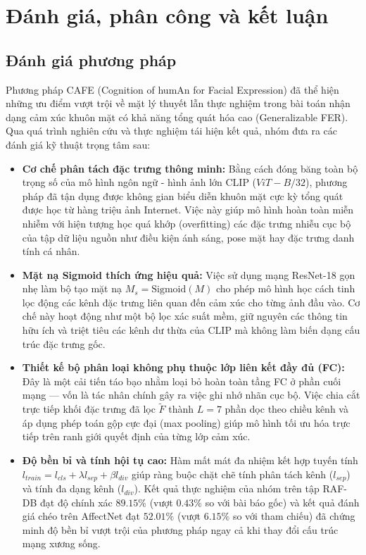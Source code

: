 \section{Đánh giá, phân công và kết luận}

\subsection{Đánh giá phương pháp}

Phương pháp CAFE (Cognition of humAn for Facial Expression) đã thể hiện những ưu điểm vượt trội về mặt lý thuyết lẫn thực nghiệm trong bài toán nhận dạng cảm xúc khuôn mặt có khả năng tổng quát hóa cao (Generalizable FER). Qua quá trình nghiên cứu và thực nghiệm tái hiện kết quả, nhóm đưa ra các đánh giá kỹ thuật trọng tâm sau:

\begin{itemize}
    \item \textbf{Cơ chế phân tách đặc trưng thông minh:} Bằng cách đóng băng toàn bộ trọng số của mô hình ngôn ngữ - hình ảnh lớn CLIP ($ViT-B/32$), phương pháp đã tận dụng được không gian biểu diễn khuôn mặt cực kỳ tổng quát được học từ hàng triệu ảnh Internet. Việc này giúp mô hình hoàn toàn miễn nhiễm với hiện tượng học quá khớp (overfitting) các đặc trưng nhiễu cục bộ của tập dữ liệu nguồn như điều kiện ánh sáng, pose mặt hay đặc trưng danh tính cá nhân.
    \item \textbf{Mặt nạ Sigmoid thích ứng hiệu quả:} Việc sử dụng mạng ResNet-18 gọn nhẹ làm bộ tạo mặt nạ $M_s = \text{Sigmoid}(M)$ cho phép mô hình học cách tinh lọc động các kênh đặc trưng liên quan đến cảm xúc cho từng ảnh đầu vào. Cơ chế này hoạt động như một bộ lọc xác suất mềm, giữ nguyên các thông tin hữu ích và triệt tiêu các kênh dư thừa của CLIP mà không làm biến dạng cấu trúc đặc trưng gốc.
    \item \textbf{Thiết kế bộ phân loại không phụ thuộc lớp liên kết đầy đủ (FC):} Đây là một cải tiến táo bạo nhằm loại bỏ hoàn toàn tầng FC ở phần cuối mạng --- vốn là tác nhân chính gây ra việc ghi nhớ nhãn cục bộ. Việc chia cắt trực tiếp khối đặc trưng đã lọc $\tilde{F}$ thành $L=7$ phần dọc theo chiều kênh và áp dụng phép toán gộp cực đại (max pooling) giúp mô hình tối ưu hóa trực tiếp trên ranh giới quyết định của từng lớp cảm xúc.
    \item \textbf{Độ bền bỉ và tính hội tụ cao:} Hàm mất mát đa nhiệm kết hợp tuyến tính $l_{train} = l_{cls} + \lambda l_{sep} + \beta l_{div}$ giúp ràng buộc chặt chẽ tính phân tách kênh ($l_{sep}$) và tính đa dạng kênh ($l_{div}$). Kết quả thực nghiệm của nhóm trên tập RAF-DB đạt độ chính xác $89.15\%$ (vượt $0.43\%$ so với bài báo gốc) và kết quả đánh giá chéo trên AffectNet đạt $52.01\%$ (vượt $6.15\%$ so với tham chiếu) đã chứng minh độ bền bỉ vượt trội của phương pháp ngay cả khi thay đổi cấu trúc mạng xương sống.
\end{itemize}

